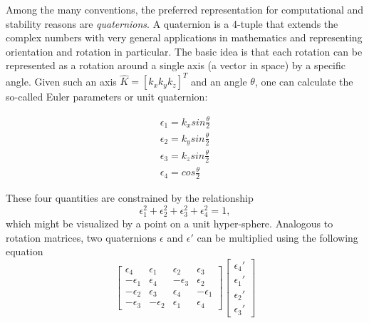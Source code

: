 Among the many conventions, the preferred representation for computational and stability reasons are \emph{quaternions}.
A quaternion is a 4-tuple that extends the complex numbers with very general applications in mathematics and representing orientation and rotation in particular. The basic idea is that each rotation can be represented as a rotation around a single axis (a vector in space) by a specific angle. Given such an axis $ \hat{K}=[k_x k_y k_z]^T$ and an angle $ \theta$, one can calculate the so-called Euler parameters or unit quaternion:

\begin{eqnarray}
\epsilon_1=k_x sin \frac{\theta}{2}\\
\epsilon_2=k_y sin \frac{\theta}{2}\\
\epsilon_3=k_z sin \frac{\theta}{2}\\
\epsilon_4=cos\frac{\theta}{2}
\end{eqnarray}

These four quantities are constrained by the relationship
\begin{equation}
\epsilon_1^2+\epsilon_2^2+\epsilon_3^2+\epsilon_4^2=1,
\end{equation}
which might be visualized by a point on a unit hyper-sphere. %
Analogous to rotation matrices, two quaternions $\epsilon$ and $\epsilon'$ can be multiplied using the following equation
\begin{equation}
\left[
\begin{array}{cccc}
\epsilon_4 & \epsilon_1 & \epsilon_2 & \epsilon_3\\
-\epsilon_1 & \epsilon_4 & -\epsilon_3 & \epsilon_2\\
-\epsilon_2 & \epsilon_3 & \epsilon_4 & -\epsilon_1\\
-\epsilon_3 & -\epsilon_2 & \epsilon_1 & \epsilon_4
\end{array}
\right]
\left[\begin{array}{c}\epsilon_4'\\\epsilon_1'\\\epsilon_2'\\\epsilon_3'\end{array}\right]
\end{equation}

